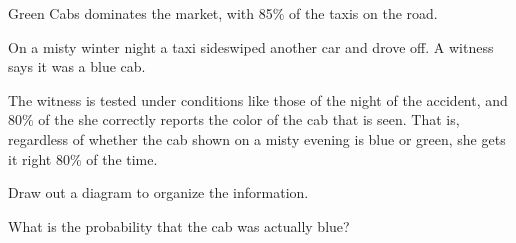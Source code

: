 \documentclass[12pt]{amsart}
\theoremstyle{definition}
\begin{document}
Green Cabs dominates the market, with 85\% of the taxis on the road.

On a misty winter night a taxi sideswiped another car and drove off. A witness says it was a blue cab.

The witness is tested under conditions like those of the night of the accident, and 80\% of the she correctly reports the color of the cab that is seen. That is, regardless of whether the cab shown on a misty evening is blue or green, she gets it right 80\% of the time.

Draw out a diagram to organize the information.

What is the probability that the cab was actually blue?
\end{document}
